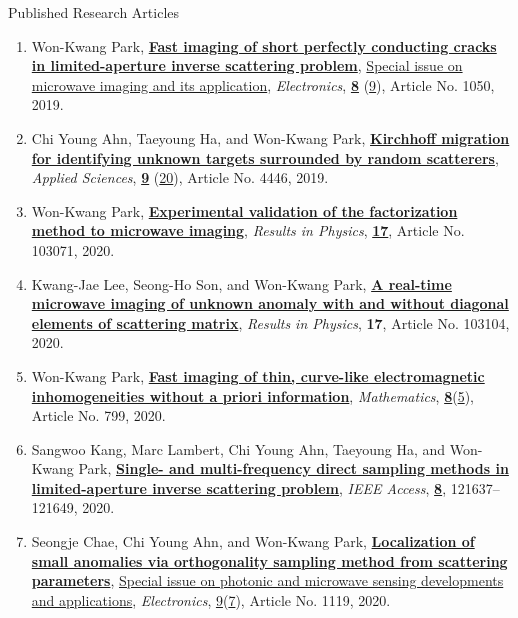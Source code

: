 \documentclass{resume} %
\begin{document}
\begin{rSection}{Published Research Articles}
\begin{enumerate}
\item\label{A-ELECT2019} Won-Kwang Park, \href{https://doi.org/10.3390/electronics8091050}{\textbf{Fast imaging of short perfectly conducting cracks in limited-aperture inverse scattering problem}}, \href{https://www.mdpi.com/journal/electronics/special_issues/ele_microwave}{Special issue on microwave imaging and its application}, \textit{Electronics}, \href{https://www.mdpi.com/2079-9292/8}{\textbf{8}} (\href{https://www.mdpi.com/2079-9292/8/9}{9}), Article No. 1050, 2019.
\item\label{A-APPLSCI2019} Chi Young Ahn, Taeyoung Ha, and Won-Kwang Park, \href{https://doi.org/10.3390/app9204446}{\textbf{Kirchhoff migration for identifying unknown targets surrounded by random scatterers}}, \textit{Applied Sciences}, \href{https://www.mdpi.com/2076-3417/9}{\textbf{9}} (\href{https://www.mdpi.com/2076-3417/9/20}{20}), Article No. 4446, 2019.
\item\label{A-RINP2020A} Won-Kwang Park, \href{https://doi.org/10.1016/j.rinp.2020.103071}{\textbf{Experimental validation of the factorization method to microwave imaging}}, \textit{Results in Physics}, \href{https://www.sciencedirect.com/science/journal/22113797/17/supp/C}{\textbf{17}}, Article No. 103071, 2020.
\item\label{A-RINP2020B} Kwang-Jae Lee, Seong-Ho Son, and Won-Kwang Park, \href{https://doi.org/10.1016/j.rinp.2020.103104}{\textbf{A real-time microwave imaging of unknown anomaly with and without diagonal elements of scattering matrix}}, \textit{Results in Physics}, \textbf{17}, Article No. 103104, 2020.
\item\label{A-MATH2020} Won-Kwang Park, \href{https://doi.org/10.3390/math8050799}{\textbf{Fast imaging of thin, curve-like electromagnetic inhomogeneities without a priori information}}, \textit{Mathematics}, \href{https://www.mdpi.com/2227-7390/8}{\textbf{8}}(\href{https://www.mdpi.com/2227-7390/8/5}{5}), Article No. 799, 2020.
\item\label{A-IEEEACCESS2020} Sangwoo Kang, Marc Lambert, Chi Young Ahn, Taeyoung Ha, and Won-Kwang Park, \href{https://doi.org/10.1109/ACCESS.2020.3006341}{\textbf{Single- and multi-frequency direct sampling methods in limited-aperture inverse scattering problem}}, \textit{IEEE Access}, \href{https://ieeexplore.ieee.org/xpl/tocresult.jsp?isnumber=8948470}{\textbf{8}}, 121637--121649, 2020.
\item\label{A-ELECTRONICS2020} Seongje Chae, Chi Young Ahn, and Won-Kwang Park, \href{https://doi.org/10.3390/electronics9071119}{\textbf{Localization of small anomalies via orthogonality sampling method from scattering parameters}}, \href{https://www.mdpi.com/journal/electronics/special_issues/Photonic}{Special issue on photonic and microwave sensing developments and applications}, \textit{Electronics}, \href{https://www.mdpi.com/2079-9292/9}{9}(\href{https://www.mdpi.com/2079-9292/9/7}{7}), Article No. 1119, 2020.

\end{enumerate}
\end{rSection}
\end{document}
